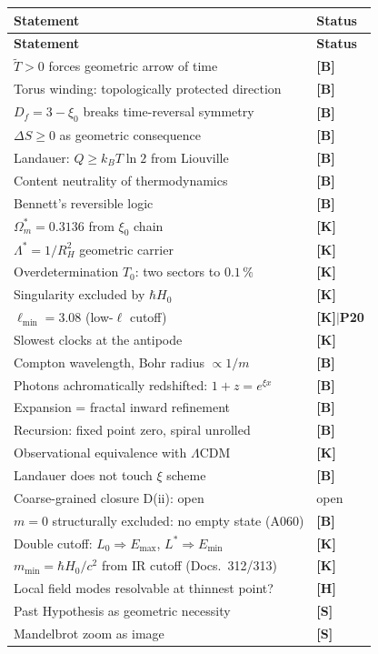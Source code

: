 \begin{center}
\small
\begin{longtable}{@{}p{}l@{}}
\toprule
\textbf{Statement} & \textbf{Status} \\
\midrule
\endfirsthead
\toprule
\textbf{Statement} & \textbf{Status} \\
\midrule
\endhead
$\tilde{T} > 0$ forces geometric arrow of time & \textbf{[B]} \\
Torus winding: topologically protected direction & \textbf{[B]} \\
$D_f = 3-\xi_0$ breaks time-reversal symmetry & \textbf{[B]} \\
$\Delta S \ge 0$ as geometric consequence & \textbf{[B]} \\
Landauer: $Q \ge k_BT\ln 2$ from Liouville & \textbf{[B]} \\
Content neutrality of thermodynamics & \textbf{[B]} \\
Bennett's reversible logic & \textbf{[B]} \\
$\Omega_m^* = 0{.}3136$ from $\xi_0$ chain & \textbf{[K]} \\
$\Lambda^* = 1/R_H^2$ geometric carrier & \textbf{[K]} \\
Overdetermination $T_0$: two sectors to $0{.}1\,\%$ & \textbf{[K]} \\
Singularity excluded by $\hbar H_0$ & \textbf{[K]} \\
$\ell_\text{min} = 3{.}08$ (low-$\ell$ cutoff) & \textbf{[K]$|$P20} \\
Slowest clocks at the antipode & \textbf{[K]} \\
Compton wavelength, Bohr radius $\propto 1/m$ & \textbf{[B]} \\
Photons achromatically redshifted: $1+z = e^{\xi x}$ & \textbf{[B]} \\
Expansion = fractal inward refinement & \textbf{[B]} \\
Recursion: fixed point zero, spiral unrolled & \textbf{[B]} \\
Observational equivalence with $\Lambda$CDM & \textbf{[K]} \\
Landauer does not touch $\xi$ scheme & \textbf{[B]} \\
Coarse-grained closure D(ii): open & open \\
$m=0$ structurally excluded: no empty state (A060) & \textbf{[B]} \\
Double cutoff: $L_0 \Rightarrow E_\text{max}$, $L^* \Rightarrow E_\text{min}$ & \textbf{[K]} \\
$m_\text{min} = \hbar H_0/c^2$ from IR cutoff (Docs.~312/313) & \textbf{[K]} \\
Local field modes resolvable at thinnest point? & \textbf{[H]} \\
Past Hypothesis as geometric necessity & \textbf{[S]} \\
Mandelbrot zoom as image & \textbf{[S]} \\
\bottomrule
\end{longtable}
\end{center}

